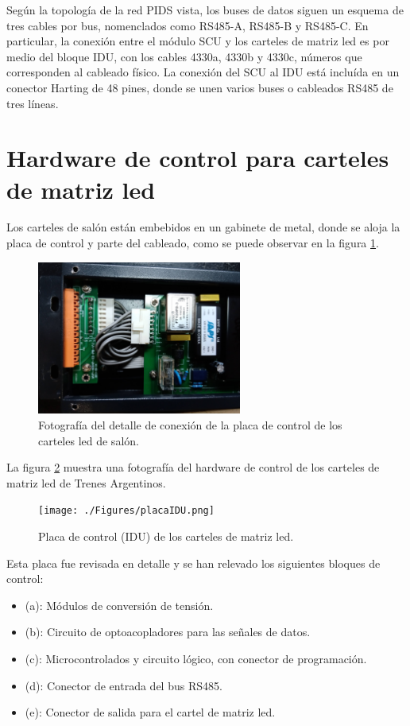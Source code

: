 Según la topología de la red PIDS vista, los buses de datos siguen un esquema de tres cables por bus, nomenclados como RS485-A, RS485-B y RS485-C. En particular, la conexión entre el módulo SCU y los carteles de matriz led es por medio del bloque IDU, con los cables 4330a, 4330b y 4330c, números que corresponden al cableado físico. La conexión del SCU al IDU está incluída en un conector Harting de 48 pines, donde se unen varios buses o cableados RS485 de tres líneas.  \\

\section{Hardware de control para carteles de matriz led}

Los carteles de salón están embebidos en un gabinete de metal, donde se aloja la placa de control y parte del cableado, como se puede observar en la figura \ref{fig:displayController}.

\begin{figure}[H]
	\centering
	\includegraphics[width=0.6\textwidth]{./Figures/displayController.jpg}
	\caption{Fotografía del detalle de conexión de la placa de control de los carteles led de salón.}
	\label{fig:displayController}
\end{figure}

La figura \ref{fig:placa} muestra una fotografía del hardware de control de los carteles de matriz led de Trenes Argentinos.\\

\begin{figure}[H]
	\centering
	\texttt{[image: ./Figures/placaIDU.png]}
	\caption{Placa de control (IDU) de los carteles de matriz led.}
	\label{fig:placa}
\end{figure}

Esta placa fue revisada en detalle y se han relevado los siguientes bloques de control:
\begin{itemize}
\item (a): Módulos de conversión de tensión.
\item (b): Circuito de optoacopladores para las señales de datos.
\item (c): Microcontrolados y circuito lógico, con conector de programación.
\item (d): Conector de entrada del bus RS485.
\item (e): Conector de salida para el cartel de matriz led.
\end{itemize}

